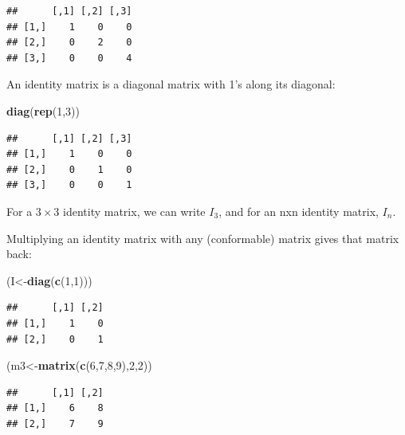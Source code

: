 \documentclass[12pt,]{krantz}
\newenvironment{Shaded}{\begin{snugshade}}{\end{snugshade}}
\newcommand{\DecValTok}[1]{\textcolor[rgb]{0.00,0.00,0.81}{#1}}
\newcommand{\KeywordTok}[1]{\textcolor[rgb]{0.13,0.29,0.53}{\textbf{#1}}}
\newcommand{\NormalTok}[1]{#1}
\newcommand{\OperatorTok}[1]{\textcolor[rgb]{0.81,0.36,0.00}{\textbf{#1}}}
\begin{document}
\begin{verbatim}
##      [,1] [,2] [,3]
## [1,]    1    0    0
## [2,]    0    2    0
## [3,]    0    0    4
\end{verbatim}

An identity matrix is a diagonal matrix with 1's along its diagonal:

\begin{Shaded}
\begin{Highlighting}[]
\KeywordTok{diag}\NormalTok{(}\KeywordTok{rep}\NormalTok{(}\DecValTok{1}\NormalTok{,}\DecValTok{3}\NormalTok{))}
\end{Highlighting}
\end{Shaded}

\begin{verbatim}
##      [,1] [,2] [,3]
## [1,]    1    0    0
## [2,]    0    1    0
## [3,]    0    0    1
\end{verbatim}

For a \(3\times 3\) identity matrix, we can write \(I_3\), and for an nxn identity matrix, \(I_n\).

Multiplying an identity matrix with any (conformable) matrix gives that matrix back:

\begin{Shaded}
\begin{Highlighting}[]
\NormalTok{(I<-}\KeywordTok{diag}\NormalTok{(}\KeywordTok{c}\NormalTok{(}\DecValTok{1}\NormalTok{,}\DecValTok{1}\NormalTok{)))}
\end{Highlighting}
\end{Shaded}

\begin{verbatim}
##      [,1] [,2]
## [1,]    1    0
## [2,]    0    1
\end{verbatim}

\begin{Shaded}
\begin{Highlighting}[]
\NormalTok{(m3<-}\KeywordTok{matrix}\NormalTok{(}\KeywordTok{c}\NormalTok{(}\DecValTok{6}\NormalTok{,}\DecValTok{7}\NormalTok{,}\DecValTok{8}\NormalTok{,}\DecValTok{9}\NormalTok{),}\DecValTok{2}\NormalTok{,}\DecValTok{2}\NormalTok{))}
\end{Highlighting}
\end{Shaded}

\begin{verbatim}
##      [,1] [,2]
## [1,]    6    8
## [2,]    7    9
\end{verbatim}

\begin{Shaded}
\end{Shaded}
\end{document}
